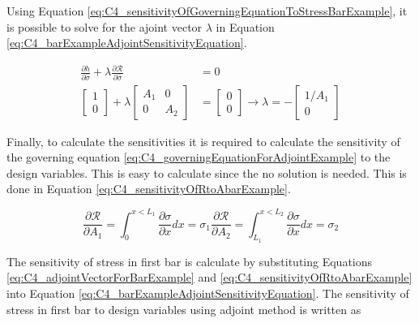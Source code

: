 Using Equation \eqref{eq:C4_sensitivityOfGoverningEquationToStressBarExample}, it is possible to solve for the ajoint vector $\lambda$ in Equation \eqref{eq:C4_barExampleAdjointSensitivityEquation}.

\begin{align}\label{eq:C4_adjointVectorForBarExample}
    \frac{\partial h}{\partial \bar{\sigma}} + \lambda \frac{\partial \mathcal{R}}{\partial \bar{\sigma}} &= 0 \nonumber \\
    \begin{bmatrix}
    1 \\
    0
    \end{bmatrix} + 
    \lambda
    \begin{bmatrix}
    A_1 & 0 \\
    0 & A_2
    \end{bmatrix}
    &=
    \begin{bmatrix}
    0 \\
    0
    \end{bmatrix} \rightarrow
    \lambda = -
    \begin{bmatrix}
    1/A_1 \\
    0
    \end{bmatrix}
\end{align}

Finally, to calculate the sensitivities it is required to calculate the sensitivity of the governing equation \eqref{eq:C4_governingEquationForAdjointExample} to the design variables. This is easy to calculate since the no solution is needed. This is done in Equation \eqref{eq:C4_sensitivityOfRtoAbarExample}.

\begin{subequations}\label{eq:C4_sensitivityOfRtoAbarExample}
\begin{equation}
    \frac{\partial \mathcal{R}}{\partial A_1} = \int_0^{x < L_1} \frac{\partial \sigma}{\partial x} dx = \sigma_1
\end{equation}
\begin{equation}
    \frac{\partial \mathcal{R}}{\partial A_2} = \int_{L_1}^{x < L_2} \frac{\partial \sigma}{\partial x} dx = \sigma_2
\end{equation}
\end{subequations}

The sensitivity of stress in first bar is calculate by substituting Equations \eqref{eq:C4_adjointVectorForBarExample} and \eqref{eq:C4_sensitivityOfRtoAbarExample} into Equation \eqref{eq:C4_barExampleAdjointSensitivityEquation}. The sensitivity of stress in first bar to design variables using adjoint method is written as

